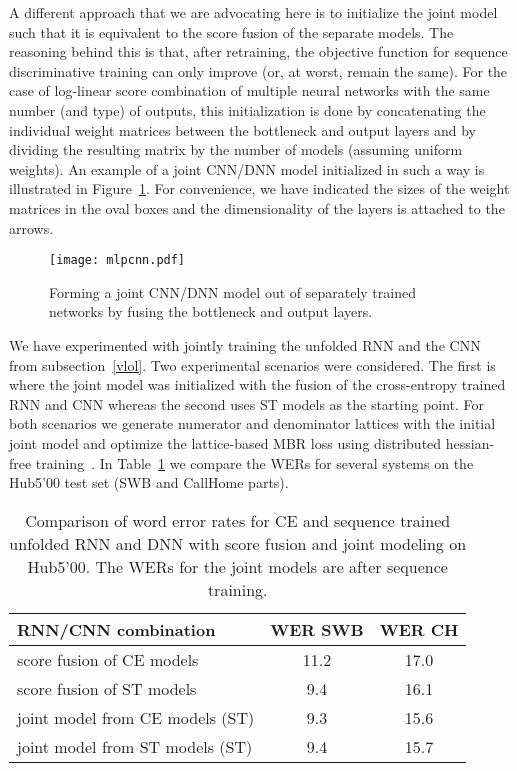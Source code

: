 \documentclass[a4paper]{article}
\begin{document}
A different approach that we are advocating here is to initialize the
joint model such that it is equivalent to the score fusion of the
separate models. The reasoning behind this is that, after retraining,
the objective function for sequence discriminative training can only
improve (or, at worst, remain the same). For the case of log-linear
score combination of multiple neural networks with the same number
(and type) of outputs, this initialization is done by concatenating
the individual weight matrices between the bottleneck and output
layers and by dividing the resulting matrix by the number of models
(assuming uniform weights). An example of a joint CNN/DNN model
initialized in such a way is illustrated in Figure~\ref{fig1}. For
convenience, we have indicated the sizes of the weight matrices in the
oval boxes and the dimensionality of the layers is attached to the
arrows.

\begin{figure}[htpb!]
\centerline{\texttt{[image: mlpcnn.pdf]}}
\caption{\label{fig1} Forming a joint CNN/DNN model out of separately trained networks by fusing the bottleneck and output layers.}
\end{figure}

We have experimented with jointly training the unfolded RNN and the CNN
from subsection~\ref{vlol}. Two experimental scenarios were
considered. The first is where the joint model was initialized with
the fusion of the cross-entropy trained RNN and CNN whereas the
second uses ST models as the starting point. For both scenarios we
generate numerator and denominator lattices with the initial joint
model and optimize the lattice-based MBR loss using distributed
hessian-free training~\cite{bedk12}. In Table~\ref{joint-tab} we
compare the WERs for several systems on the Hub5'00 test set (SWB and
CallHome parts).

\begin{table}[htpb!]
\begin{center}
\begin{tabular}{|l|c|c|} \hline
RNN/CNN combination & WER SWB & WER CH\\ \hline 
score fusion of CE models       & 11.2  & 17.0 \\ \hline
score fusion of ST models       & 9.4   & 16.1\\ \hline
joint model from CE models (ST) & 9.3   & 15.6\\ \hline
joint model from ST models (ST) & 9.4   & 15.7\\ \hline
\end{tabular}
\end{center}
\caption{\label{joint-tab}
Comparison of word error rates for CE and sequence trained unfolded RNN and DNN with score fusion and joint modeling on Hub5'00. The WERs for the joint models are after sequence training.}
\end{table}
\end{document}
